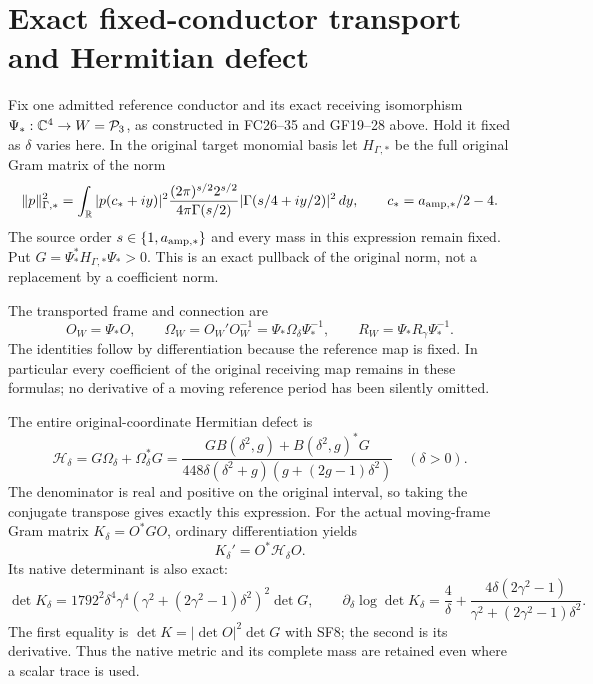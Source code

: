 \section{Exact fixed-conductor transport and Hermitian defect}
Fix one admitted reference conductor and its exact receiving
isomorphism $\Psi_*:\mathbb C^4\to W=\mathcal P_3$, as constructed in
FC26--35 and GF19--28 above. Hold it fixed as $\delta$ varies here.
In the original target monomial basis let $H_{\Gamma,*}$ be
the full original Gram matrix of the norm
\[
 \|p\|_{\Gamma,*}^2=\int_{\mathbb R}|p(c_*+iy)|^2
 \frac{(2\pi)^{s/2}2^{s/2}}{4\pi\Gamma(s/2)}
 |\Gamma(s/4+iy/2)|^2\,dy,
 \qquad c_*=a_{\rm amp,*}/2-4.
\]
The source order $s\in\{1,a_{\rm amp,*}\}$ and every mass
in this expression remain fixed. Put
$G=\Psi_*^*H_{\Gamma,*}\Psi_*>0$. This is an exact pullback
of the original norm, not a replacement by a coefficient norm.

The transported frame and connection are
\begin{equation}
 O_W=\Psi_*O,\qquad
 \Omega_W=O_W'O_W^{-1}=\Psi_*\Omega_\delta\Psi_*^{-1},
 \qquad R_W=\Psi_*R_\gamma\Psi_*^{-1}.
 \tag{SF14}
\end{equation}
The identities follow by differentiation because the reference
map is fixed. In particular every coefficient of the original
receiving map remains in these formulas; no derivative of a
moving reference period has been silently omitted.

The entire original-coordinate Hermitian defect is
\begin{equation}
 \mathscr H_\delta=G\Omega_\delta+\Omega_\delta^*G
    =\frac{G B(\delta^2,g)+B(\delta^2,g)^*G}
                 {448\delta(\delta^2+g)(g+(2g-1)\delta^2)}
 \quad(\delta>0).
 \tag{SF15}
\end{equation}
The denominator is real and positive on the original interval,
so taking the conjugate transpose gives exactly this expression.
For the actual moving-frame Gram matrix $K_\delta=O^*GO$,
ordinary differentiation yields
\begin{equation}
 K_\delta'=O^*\mathscr H_\delta O.
 \tag{SF16}
\end{equation}
Its native determinant is also exact:
\[
 \det K_\delta=1792^2\delta^4\gamma^4
       (\gamma^2+(2\gamma^2-1)\delta^2)^2\det G,
 \qquad
 \partial_\delta\log\det K_\delta
  =\frac4\delta+
    \frac{4\delta(2\gamma^2-1)}{\gamma^2+(2\gamma^2-1)\delta^2}.
\]
The first equality is $\det K=|\det O|^2\det G$ with SF8;
the second is its derivative. Thus the native metric and its
complete mass are retained even where a scalar trace is used.


